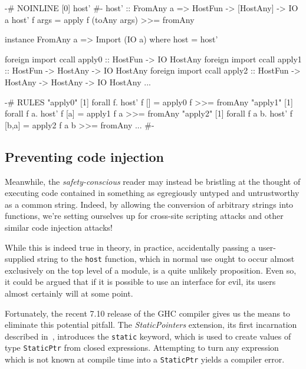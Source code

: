 \documentclass[preprint]{sigplanconf}
\begin{document}
\begin{listingfloat}
\begin{code}
  {-# NOINLINE [0] host' #-}
  host' :: FromAny a => HostFun -> [HostAny] -> IO a
  host' f args = apply f (toAny args) >>= fromAny

  instance FromAny a => Import (IO a) where
    host = host'
  
  foreign import ccall apply0 ::
    HostFun -> IO HostAny
  foreign import ccall apply1 ::
    HostFun -> HostAny -> IO HostAny
  foreign import ccall apply2 ::
    HostFun -> HostAny -> HostAny -> IO HostAny
  ...
  
  {-# RULES
    "apply0" [1] forall f. host' f [] =
                 apply0 f >>= fromAny
    "apply1" [1] forall f a. host' f [a] =
                 apply1 f a >>= fromAny
    "apply2" [1] forall f a b. host' f [b,a] =
                 apply2 f a b >>= fromAny
    ...
   #- }
\end{code}
\caption{Specializing the \lstinline!host! base case}
\label{lst:specialization}
\end{listingfloat}

\subsection{Preventing code injection}
\label{sec:safe_host}
Meanwhile, the \emph{safety-conscious} reader may instead be bristling at the
thought of executing code contained in something as egregiously untyped and
untrustworthy as a common string.
Indeed, by allowing the conversion of arbitrary strings
into functions, we're setting ourselves up for cross-site scripting attacks
and other similar code injection attacks!

While this is indeed true in theory, in practice, accidentally passing a
user-supplied string to the \lstinline!host! function, which in normal use
ought to occur almost exclusively on the top level of a module, is a quite
unlikely proposition. Even so, it could be argued that if it is possible to use
an interface for evil, its users almost certainly will at some point.

Fortunately, the recent 7.10 release of the GHC compiler gives us the means to
eliminate this potential pitfall. The \emph{StaticPointers} extension, its
first incarnation described in\ \cite{cloudhaskell}, introduces the
\lstinline!static! keyword, which is used to create values of type
\lstinline!StaticPtr! from closed expressions. Attempting to turn any
expression which is not known at compile time into a \lstinline!StaticPtr!
yields a compiler error.
\end{document}
